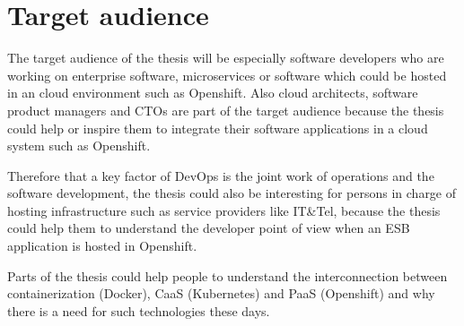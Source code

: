 \section{Target audience}
\label{sec:target-audience}
The target audience of the thesis will be especially software developers who are working on enterprise software, microservices or software which could be hosted in an cloud environment such as Openshift. Also cloud architects, software product managers and CTOs are part of the target audience because the thesis could help or inspire them to integrate their software applications in a cloud system such as Openshift.

Therefore that a key factor of DevOps is the joint work of operations and the software development, the thesis could also be interesting for persons in charge of hosting infrastructure such as service providers like IT\&Tel, because the thesis could help them to understand the developer point of view when an ESB application is hosted in Openshift.

Parts of the thesis could help people to understand the interconnection between containerization (Docker), CaaS (Kubernetes) and PaaS (Openshift) and why there is a need for such technologies these days.





